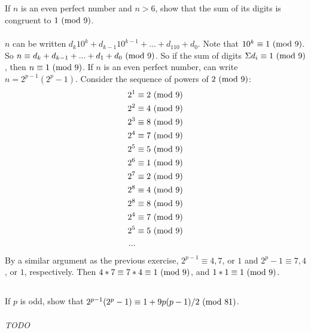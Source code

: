 \documentclass{article}
\begin{document}
\subsection{}
If $n$ is an even perfect number and $n > 6$, show that the sum of its digits
is congruent to $1 \ (\mathrm{mod}\ 9)$.\\~\\
$n$ can be written $d_k10^k + d_{k-1}10^{k-1} + ... + d_110 + d_0$.
Note that $10^k \equiv 1 \ (\mathrm{mod}\ 9)$.
So $n \equiv d_k + d_{k-1} + ... + d_1 + d_0 \ (\mathrm{mod}\ 9)$.
So if the sum of digits $\Sigma d_i \equiv 1 \ (\mathrm{mod}\ 9)$, then $n \equiv 1 \ (\mathrm{mod}\ 9)$.
If $n$ is an even perfect number, can write $n = 2^{p - 1}(2^p - 1)$.
Consider the sequence of powers of $2 \ (\mathrm{mod}\ 9)$:
\begin{align*}
    2^1 &\equiv 2 \ (\mathrm{mod}\ 9)\\
    2^2 &\equiv 4 \ (\mathrm{mod}\ 9)\\
    2^3 &\equiv 8 \ (\mathrm{mod}\ 9)\\
    2^4 &\equiv 7 \ (\mathrm{mod}\ 9)\\
    2^5 &\equiv 5 \ (\mathrm{mod}\ 9)\\
    2^6 &\equiv 1 \ (\mathrm{mod}\ 9)\\
    2^7 &\equiv 2 \ (\mathrm{mod}\ 9)\\
    2^8 &\equiv 4 \ (\mathrm{mod}\ 9)\\
    2^8 &\equiv 8 \ (\mathrm{mod}\ 9)\\
    2^4 &\equiv 7 \ (\mathrm{mod}\ 9)\\
    2^5 &\equiv 5 \ (\mathrm{mod}\ 9)\\
    ...
\end{align*}
By a similar argument as the previous exercise,
$2^{p - 1} \equiv 4, 7$, or $1$ and $2^p - 1 \equiv 7, 4$, or $1$, respectively.
Then $4 * 7 \equiv 7 * 4 \equiv 1 \ (\mathrm{mod}\ 9)$, and $1 * 1 \equiv 1 \ (\mathrm{mod}\ 9)$.

\subsection{}
If $p$ is odd, show that $2^{p - 1}(2^p - 1) \equiv 1 + 9p(p - 1)/2 \ (\mathrm{mod}\ 81)$.\\~\\
\textit{TODO}
\end{document}
